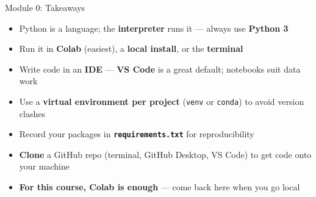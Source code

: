 \documentclass[aspectratio=169]{beamer}
\begin{document}
\begin{frame}{Module 0: Takeaways}
\vspace{0.25cm}
\begin{itemize}\setlength\itemsep{8pt}
  \item[\textcolor{wurgreen}{\faCheck}]
    Python is a language; the \textbf{interpreter} runs it --- always use \textbf{Python 3}
  \item[\textcolor{wurgreen}{\faCheck}]
    Run it in \textbf{Colab} (easiest), a \textbf{local install}, or the \textbf{terminal}
  \item[\textcolor{wurgreen}{\faCheck}]
    Write code in an \textbf{IDE} --- \textbf{VS Code} is a great default; notebooks suit data work
  \item[\textcolor{wurgreen}{\faCheck}]
    Use a \textbf{virtual environment per project} (\texttt{venv} or \texttt{conda}) to avoid
    version clashes
  \item[\textcolor{wurgreen}{\faCheck}]
    Record your packages in \textbf{\texttt{requirements.txt}} for reproducibility
  \item[\textcolor{wurgreen}{\faCheck}]
    \textbf{Clone} a GitHub repo (terminal, GitHub Desktop, VS Code) to get code onto your machine
  \item[\textcolor{wurgreen}{\faCheck}]
    \textbf{For this course, Colab is enough} --- come back here when you go local
\end{itemize}

\medskip
{}
\end{frame}
\end{document}

